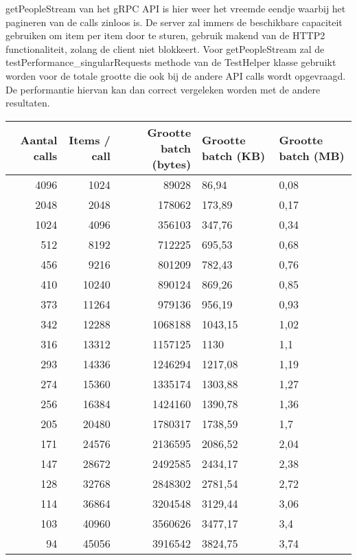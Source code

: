 getPeopleStream van het gRPC API is hier weer het vreemde eendje waarbij het pagineren van de calls zinloos is. De server zal immers de beschikbare capaciteit gebruiken
om item per item door te sturen, gebruik makend van de HTTP2 functionaliteit, zolang de client niet blokkeert. Voor getPeopleStream zal de testPerformance\_singularRequests methode van
de TestHelper klasse gebruikt worden voor de totale grootte die ook bij de andere API calls wordt opgevraagd.
De performantie hiervan kan dan correct vergeleken worden met de andere resultaten.\\

\begin{table}
    \centering
    \begin{tabular}{rrrll}
        \toprule
        \textbf{Aantal calls} & \textbf{Items / call} & \textbf{Grootte batch (bytes)} & \textbf{Grootte batch (KB)} & \textbf{Grootte batch (MB)} \\
        \midrule
        4096 & 1024 & 89028 & 86,94 & 0,08 \\
        2048 & 2048 & 178062 & 173,89 & 0,17 \\
        1024 & 4096 & 356103 & 347,76 & 0,34 \\
        512 & 8192 & 712225 & 695,53 & 0,68 \\
        456 & 9216 & 801209 & 782,43 & 0,76 \\
        410 & 10240 & 890124 & 869,26 & 0,85 \\
        373 & 11264 & 979136 & 956,19 & 0,93 \\
        342 & 12288 & 1068188 & 1043,15 & 1,02 \\
        316 & 13312 & 1157125 & 1130 & 1,1 \\
        293 & 14336 & 1246294 & 1217,08 & 1,19 \\
        274 & 15360 & 1335174 & 1303,88 & 1,27 \\
        256 & 16384 & 1424160 & 1390,78 & 1,36 \\
        205 & 20480 & 1780317 & 1738,59 & 1,7 \\
        171 & 24576 & 2136595 & 2086,52 & 2,04 \\
        147 & 28672 & 2492585 & 2434,17 & 2,38 \\
        128 & 32768 & 2848302 & 2781,54 & 2,72 \\
        114 & 36864 & 3204548 & 3129,44 & 3,06 \\
        103 & 40960 & 3560626 & 3477,17 & 3,4 \\
        94 & 45056 & 3916542 & 3824,75 & 3,74 \\

\end{tabular}
\end{table}
